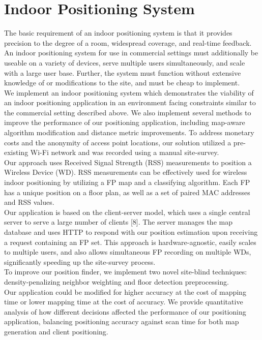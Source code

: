 \documentclass[conference]{IEEEtran}
\begin{document}
\section{Indoor Positioning System}
The basic requirement of an indoor positioning system is that it provides precision to the degree of a room, widespread coverage, and real-time feedback. An indoor positioning system for use in commercial settings must additionally be useable on a variety of devices, serve multiple users simultaneously, and scale with a large user base. Further, the system must function without extensive knowledge of or modifications to the site, and must be cheap to implement. \\
\indent We implement an indoor positioning system which demonstrates the viability of an indoor positioning application in an environment facing constraints similar to the commercial setting described above. We also implement several methods to improve the performance of our positioning application, including map-aware algorithm modification and distance metric improvements. To address monetary costs and the anonymity of access point locations, our solution utilized a pre-existing Wi-Fi network and was recorded using a manual site-survey.\\
\indent Our approach uses Received Signal Strength (RSS) measurements to position a Wireless Device (WD). RSS measurements can be effectively used for wireless indoor positioning by utilizing a FP map and a classifying algorithm. Each FP has a unique position on a floor plan, as well as a set of paired MAC addresses and RSS values.\\
\indent Our application is based on the client-server model, which uses a single central server to serve a large number of clients [8]. The server manages the map database and uses HTTP to respond with our position estimation upon receiving a request containing an FP set. This approach is hardware-agnostic, easily scales to multiple users, and also allows simultaneous FP recording on multiple WDs, significantly speeding up the site-survey process.\\ 
\indent To improve our position finder, we implement two novel site-blind techniques: density-penalizing neighbor weighting and floor detection preprocessing.\\
\indent Our application could be modified for higher accuracy at the cost of mapping time or lower mapping time at the cost of accuracy. We provide quantitative analysis of how different decisions affected the performance of our positioning application, balancing positioning accuracy against scan time for both map generation and client positioning.
\end{document}
